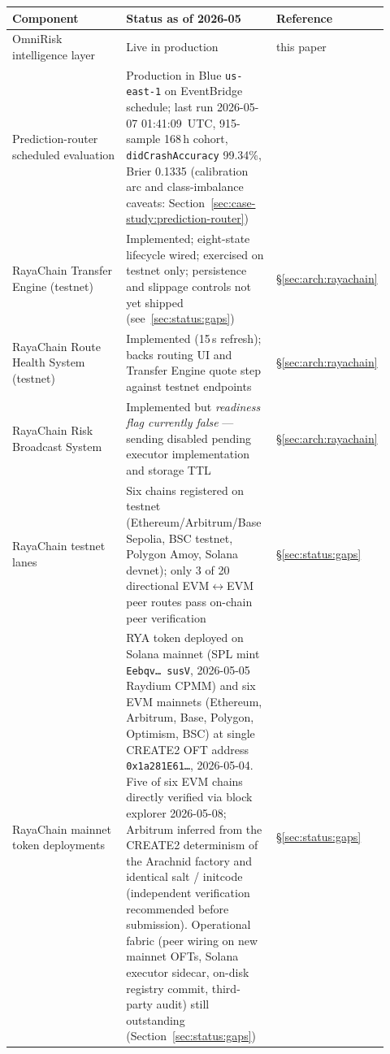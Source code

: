 \documentclass[11pt,a4paper]{article}
\begin{document}
\begin{table}[h]
\centering
\begin{tabular}{p{0.32\linewidth}p{0.40\linewidth}p{0.20\linewidth}}
\toprule
\textbf{Component} & \textbf{Status as of 2026-05} & \textbf{Reference} \\
\midrule
OmniRisk intelligence layer
  & Live in production
  & this paper \\
Prediction-router scheduled evaluation
  & Production in Blue \texttt{us-east-1} on EventBridge schedule;
    last run 2026-05-07 01:41:09~UTC, 915-sample 168\,h cohort,
    \texttt{didCrashAccuracy} 99.34\%, Brier 0.1335 (calibration arc and
    class-imbalance caveats: Section~\ref{sec:case-study:prediction-router})
  & \cite{omnirisk2026predmetrics} \\
RayaChain Transfer Engine (testnet)
  & Implemented; eight-state lifecycle wired; exercised on testnet only;
    persistence and slippage controls not yet shipped
    (see~\ref{sec:status:gaps})
  & \S\ref{sec:arch:rayachain} \\
RayaChain Route Health System (testnet)
  & Implemented (15\,s refresh); backs routing UI and Transfer Engine quote step
    against testnet endpoints
  & \S\ref{sec:arch:rayachain} \\
RayaChain Risk Broadcast System
  & Implemented but \emph{readiness flag currently false} --- sending disabled
    pending executor implementation and storage TTL
  & \S\ref{sec:arch:rayachain} \\
RayaChain testnet lanes
  & Six chains registered on testnet (Ethereum/Arbitrum/Base Sepolia, BSC
    testnet, Polygon Amoy, Solana devnet); only 3 of 20 directional
    EVM$\leftrightarrow$EVM peer routes pass on-chain peer verification
  & \S\ref{sec:status:gaps} \\
RayaChain mainnet token deployments
  & RYA token deployed on Solana mainnet (SPL mint \texttt{Eebqv\dots
    susV}, 2026-05-05 Raydium CPMM) and six EVM mainnets (Ethereum,
    Arbitrum, Base, Polygon, Optimism, BSC) at single CREATE2 OFT address
    \texttt{0x1a281E61\dots}, 2026-05-04. Five of six EVM chains directly
    verified via block explorer 2026-05-08; Arbitrum inferred from the
    CREATE2 determinism of the Arachnid factory and identical salt /
    initcode (independent verification recommended before submission).
    Operational fabric (peer wiring on new mainnet OFTs, Solana executor
    sidecar, on-disk registry commit, third-party audit) still
    outstanding (Section~\ref{sec:status:gaps})
  & \S\ref{sec:status:gaps} \\

\end{tabular}
\end{table}
\end{document}
